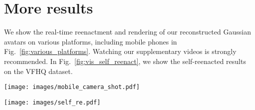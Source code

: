 \section{More results}
We show the real-time reenactment and rendering of our reconstructed Gaussian avatars on various platforms, including mobile phones in Fig.~\ref{fig:various_platforms}. Watching our supplementary videos is strongly recommended.
In Fig.~\ref{fig:vis_self_reenact}, we show the self-reenacted results on the VFHQ dataset. 

  
\begin{figure*}
  \centering
    \texttt{[image: images/mobile\_camera\_shot.pdf]}
    \vspace{-8mm}
  \caption{Visualization of the reenactment and rendering of our reconstructed Gaussian avatar on various computing platforms, including mobile phones.}
  \Description{}
  \label{fig:various_platforms}
\end{figure*}

\begin{figure*}
  \centering
    \texttt{[image: images/self\_re.pdf]}
    \vspace{-8mm}
  \caption{Visualization of self-reenacted results on the VFHQ dataset.}
  \Description{}
  \label{fig:vis_self_reenact}
\end{figure*}